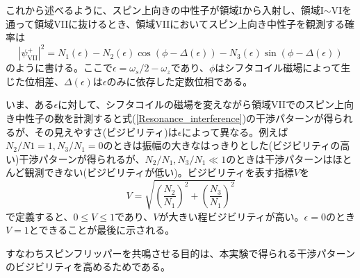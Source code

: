 これから述べるように、スピン上向きの中性子が領域Iから入射し、領域I$\sim$VIを通って領域VIIに抜けるとき、領域VIIにおいてスピン上向き中性子を観測する確率は
\begin{equation}
|\psi_\mathrm{VII}^+|^2=N_1(\epsilon)-N_2(\epsilon) \cos (\phi -\Delta(\epsilon)) -N_3(\epsilon) \sin(\phi-\Delta(\epsilon)) \label{Resonance_interference}
\end{equation}
のように書ける。ここで$\epsilon=\omega_s/2-\omega_z$であり、$\phi$はシフタコイル磁場によって生じた位相差、$\Delta(\epsilon)$は$\epsilon$のみに依存した定数位相である。

いま、ある$\epsilon$に対して、シフタコイルの磁場を変えながら領域VIIでのスピン上向き中性子の数を計測すると式(\ref{Resonance_interference})の干渉パターンが得られるが、その見えやすさ(ビジビリティ)は$\epsilon$によって異なる。例えば$N_2/N1=1,N_3/N_1=0$のときは振幅の大きなはっきりとした(ビジビリティの高い)干渉パターンが得られるが、$N_2/N_1,N_3/N_1 \ll 1$のときは干渉パターンはほとんど観測できない(ビジビリティが低い)。ビジビリティを表す指標$V$を
\begin{equation}
V=\sqrt{\left(\frac{N_2}{N_1}\right)^2+\left(\frac{N_3}{N_1}\right)^2}
\end{equation}
で定義すると、$0 \le V \le 1$であり、$V$が大きい程ビジビリティが高い。$\epsilon=0$のとき$V=1$とできることが最後に示される。

すなわちスピンフリッパーを共鳴させる目的は、本実験で得られる干渉パターンのビジビリティを高めるためである。



